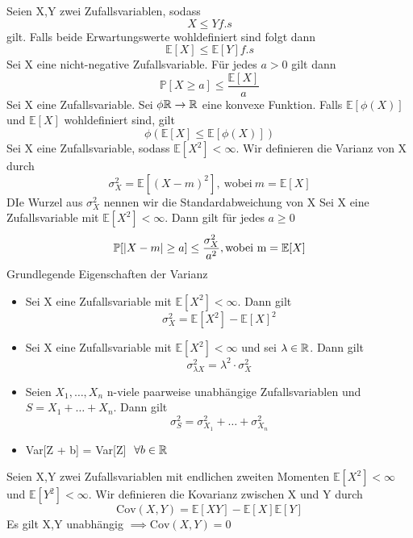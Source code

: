 \Satz[4.19] \newline
Seien X,Y zwei Zufallsvariablen, sodass \[ X \leq Y f.s\] gilt. Falls beide Erwartungswerte wohldefiniert sind folgt dann \[ \mathbb{E}[X] \leq \mathbb{E}[Y] f.s\]
 \newline
Sei X eine nicht-negative Zufallsvariable. Für jedes \( a > 0\) gilt dann \[ \mathbb{P}[X \geq a ] \leq \frac{\mathbb{E}[X]}{a}\]
 \newline
Sei X eine Zufallsvariable. Sei \( \phi \mathbb{R} \rightarrow \mathbb{R} \) eine konvexe Funktion. Falls \( \mathbb{E}[\phi(X)]\) und \( \mathbb{E}[X]\) wohldefiniert sind, gilt \[ \phi(\mathbb{E}[X] \leq \mathbb{E}[\phi(X)])\]
\Def[4.22] Sei X eine Zufallsvariable, sodass \( \mathbb{E}[X^2] < \infty \). Wir definieren die Varianz von X durch \[ \sigma_X^2 = \mathbb{E}[(X-m)^2], \ \text{wobei} \ m=\mathbb{E}[X]\] DIe Wurzel aus \(\sigma_X^2\) nennen wir die Standardabweichung von X \newline
{} \newline
Sei X eine Zufallsvariable mit \( \mathbb{E}[X^2] < \infty\). Dann gilt für jedes \( a \geq 0\) \[ \mathbb{P}[\left\lvert X -m \right\rvert \geq a] \leq \frac{\sigma_X^2}{a^2}, \text{wobei m} = \mathbb{E}[X]\]
\Satz[4.25] Grundlegende Eigenschaften der Varianz \newline
\begin{itemize}
    \item Sei X eine Zufallsvariable mit \( \mathbb{E}[X^2] < \infty \). Dann gilt \[ \sigma_X^2 = \mathbb{E}[X^2] - \mathbb{E}[X]^2\]
    \item Sei X eine Zufallsvariable mit \( \mathbb{E}[X^2] < \infty \) und sei \( \lambda \in \mathbb{R} \). Dann gilt \[ \sigma_{\lambda X}^2 = \lambda^2 \cdot \sigma_X^2\]
    \item Seien \(X_1, \dots , X_n \) n-viele paarweise unabhängige Zufallsvariablen und \(S = X_1 + \dots + X_n\). Dann gilt \[ \sigma_S^2 = \sigma_{X_1}^2 + \dots + \sigma_{X_n}^2\]
    \item Var[Z + b] = Var[Z] \(\  \forall b \in \mathbb{R} \)
\end{itemize}
\Def[4.26] \newline
Seien X,Y zwei Zufallsvariablen mit endlichen zweiten Momenten \( \mathbb{E}[X^2] < \infty \) und \( \mathbb{E}[Y^2] < \infty \). Wir definieren die Kovarianz zwischen X und Y durch \[\text{Cov}(X,Y) = \mathbb{E}[XY]-\mathbb{E}[X]\mathbb{E}[Y]\]
\Bem[4.26A] \newline
Es gilt X,Y unabhängig \( \implies \text{Cov}(X,Y) = 0\)
